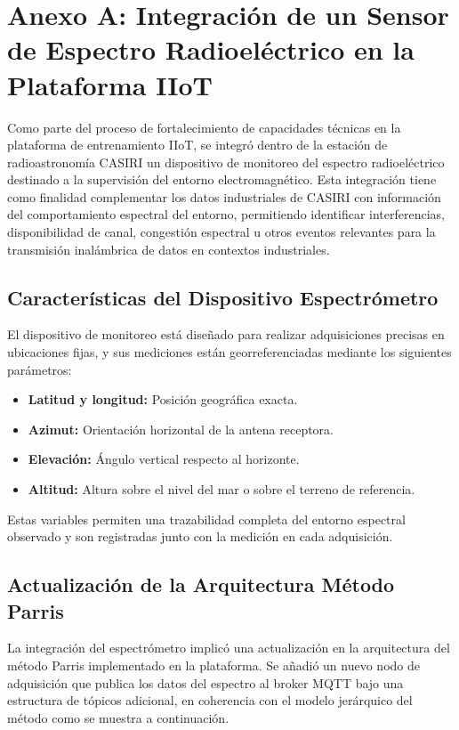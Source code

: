 
\section{Anexo A: Integración de un Sensor de Espectro Radioeléctrico en la Plataforma IIoT}

Como parte del proceso de fortalecimiento de capacidades técnicas en la plataforma de entrenamiento IIoT, se integró dentro de la estación de radioastronomía CASIRI un dispositivo de monitoreo del espectro radioeléctrico destinado a la supervisión del entorno electromagnético. Esta integración tiene como finalidad complementar los datos industriales de CASIRI con información del comportamiento espectral del entorno, permitiendo identificar interferencias, disponibilidad de canal, congestión espectral u otros eventos relevantes para la transmisión inalámbrica de datos en contextos industriales.

\subsection{Características del Dispositivo Espectrómetro}
El dispositivo de monitoreo está diseñado para realizar adquisiciones precisas en ubicaciones fijas, y sus mediciones están georreferenciadas mediante los siguientes parámetros:
\begin{itemize}
    \item \textbf{Latitud y longitud:} Posición geográfica exacta.

    \item \textbf{Azimut:} Orientación horizontal de la antena receptora.

    \item \textbf{Elevación:} Ángulo vertical respecto al horizonte.

    \item \textbf{Altitud:} Altura sobre el nivel del mar o sobre el terreno de referencia.

\end{itemize}

Estas variables permiten una trazabilidad completa del entorno espectral observado y son registradas junto con la medición en cada adquisición.

\subsection{Actualización de la Arquitectura Método Parris}
La integración del espectrómetro implicó una actualización en la arquitectura del método Parris implementado en la plataforma. Se añadió un nuevo nodo de adquisición que publica los datos del espectro al broker MQTT bajo una estructura de tópicos adicional, en coherencia con el modelo jerárquico del método como se muestra a continuación.

